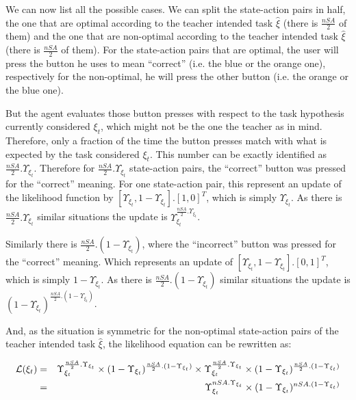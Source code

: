 We can now list all the possible cases. We can split the state-action pairs in half, the one that are optimal according to the teacher intended task $\hat{\xi}$ (there is $\frac{nSA}{2}$ of them) and the one that are non-optimal according to the teacher intended task $\hat{\xi}$ (there is $\frac{nSA}{2}$ of them). For the state-action pairs that are optimal, the user will press the button he uses to mean ``correct'' (i.e. the blue or the orange one), respectively for the non-optimal, he will press the other button (i.e. the orange or the blue one).

But the agent evaluates those button presses with respect to the task hypothesis currently considered $\xi_t$, which might not be the one the teacher as in mind. Therefore, only a fraction of the time the button presses match with what is expected by the task considered $\xi_t$. This number can be exactly identified as $\frac{nSA}{2}.\Upsilon_{\xi_t}$. Therefore for $\frac{nSA}{2}.\Upsilon_{\xi_t}$ state-action pairs, the ``correct'' button was pressed for the ``correct'' meaning. For one state-action pair, this represent an update of the likelihood function by $[\Upsilon_{\xi_t},1-\Upsilon_{\xi_t}].[1,0]^T$, which is simply $\Upsilon_{\xi_t}$. As there is $\frac{nSA}{2}.\Upsilon_{\xi_t}$ similar situations the update is $\Upsilon_{\xi_t}^{\frac{nSA}{2}.\Upsilon_{\xi_t}}$.

Similarly there is $\frac{nSA}{2}.(1-\Upsilon_{\xi_t})$, where the ``incorrect'' button was pressed for the ``correct'' meaning. Which represents an update of $[\Upsilon_{\xi_t},1-\Upsilon_{\xi_t}].[0,1]^T$, which is simply $1-\Upsilon_{\xi_t}$. As there is $\frac{nSA}{2}.(1-\Upsilon_{\xi_t})$ similar situations the update is $(1-\Upsilon_{\xi_t})^{\frac{nSA}{2}.(1-\Upsilon_{\xi_t})}$.

And, as the situation is symmetric for the non-optimal state-action pairs of the teacher intended task $\hat{\xi}$, the likelihood equation can be rewritten as:

\begin{eqnarray}
\mathcal{L}(\xi_t) &=& \Upsilon_{\xi_t}^{\frac{nSA}{2}.\Upsilon_{\xi_t}} \times (1-\Upsilon_{\xi_t})^{\frac{nSA}{2}.(1-\Upsilon_{\xi_t})} \times \Upsilon_{\xi_t}^{\frac{nSA}{2}.\Upsilon_{\xi_t}} \times (1-\Upsilon_{\xi_t})^{\frac{nSA}{2}.(1-\Upsilon_{\xi_t})} \nonumber \\
&=& \Upsilon_{\xi_t}^{nSA.\Upsilon_{\xi_t}} \times (1-\Upsilon_{\xi_t})^{nSA.(1-\Upsilon_{\xi_t})}
\label{eq:likelihoodproof} 
\end{eqnarray}

